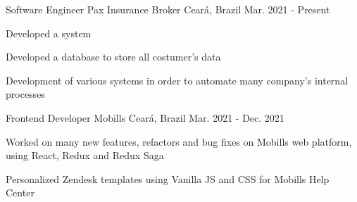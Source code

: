 

\begin{cventries}

  \cventry
    {Software Engineer} %
    {Pax Insurance Broker} %
    {Ceará, Brazil} %
    {Mar. 2021 - Present} %
    {
      \begin{cvitems} %
        \item {Developed a system}
        \item {Developed a database to store
        all costumer's data}
        \item {Development of various systems in order to automate many company's internal processes}
      \end{cvitems}
    }

  \cventry
    {Frontend Developer} %
    {Mobills} %
    {Ceará, Brazil} %
    {Mar. 2021 - Dec. 2021} %
    {
      \begin{cvitems} %
        \item {Worked on many new features,
        refactors and bug fixes on Mobills
        web platform, using React, Redux
        and Redux Saga}
        \item {Personalized Zendesk templates
        using Vanilla JS and CSS for
        Mobills Help Center}
      \end{cvitems}
    }

\end{cventries}
